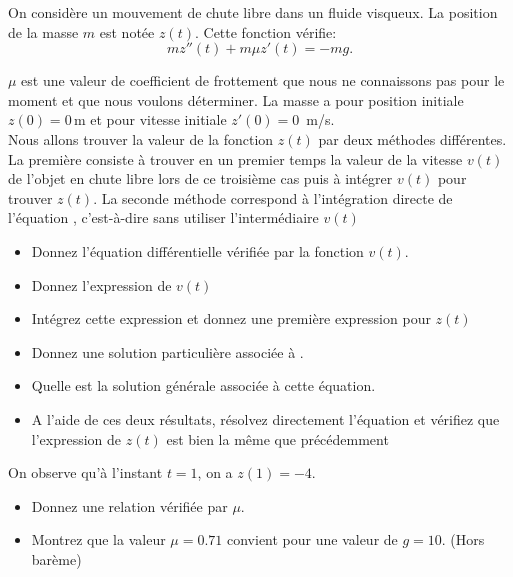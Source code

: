 \bexo

On considère un mouvement de chute libre dans un fluide visqueux. La position de la masse $m$ est notée $z(t)$. Cette fonction vérifie:
\begin{equation}\label{eq:ode_2}
mz''(t)+m\mu z'(t)=-mg.
\end{equation}

$\mu$ est une valeur de coefficient de frottement que nous ne connaissons pas pour le moment et que nous voulons déterminer. La masse a pour position initiale $z(0)=0$\,m et pour vitesse initiale $z'(0)=0\,$ m/s.\\

Nous allons trouver la valeur de la fonction $z(t)$ par deux méthodes différentes. La première consiste à trouver en un premier temps la valeur de la vitesse $v(t)$ de l'objet en chute libre lors de ce troisième cas puis à intégrer $v(t)$ pour trouver $z(t)$. La seconde méthode correspond à l'intégration directe de l'équation , c'est-à-dire sans utiliser l'intermédiaire $v(t)$

\begin{itemize}
\item Donnez l'équation différentielle vérifiée par la fonction $v(t)$.
\item Donnez l'expression de $v(t)$
\item Intégrez cette expression et donnez une première expression pour $z(t)$
\item Donnez une solution particulière associée à .
\item Quelle est la solution générale associée à cette équation. 
\item A l'aide de ces deux résultats, résolvez directement l'équation  et vérifiez que l'expression de $z(t)$ est bien la même que précédemment \end{itemize}

On observe qu'à l'instant $t=1$, on a $z(1)=-4$.

\begin{itemize}
\item Donnez une relation vérifiée par $\mu$.
\item Montrez que la valeur $\mu=0.71$ convient pour une valeur de $g=10$. (Hors barème)
\end{itemize}



\eexo
